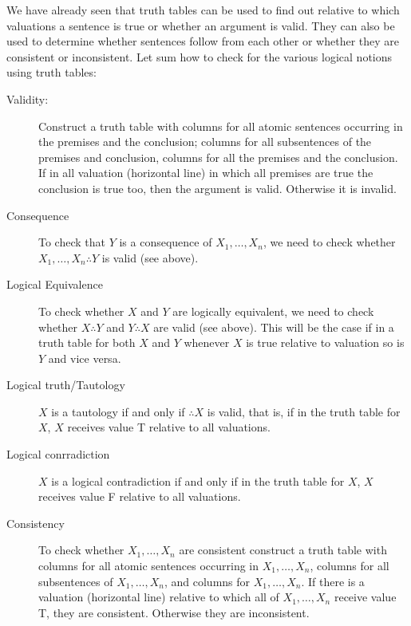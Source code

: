 We have already seen that truth tables can be used to find out relative to which valuations a sentence is true or whether an argument is valid. They can also be used to determine whether sentences follow from each other or whether they are consistent or inconsistent. Let sum how to check for the various logical notions using truth tables:

\begin{description}
\item[Validity:]Construct a truth table with columns for all atomic sentences occurring in the premises and the conclusion; columns for all subsentences of the premises and conclusion, columns for all the premises and the conclusion. If in all valuation (horizontal line) in which all premises are true the conclusion is true too, then the argument is valid. Otherwise it is invalid.
\item[Consequence]To check that $Y$ is a consequence of $X_1,\ldots,X_n$, we need to check whether $X_1,\ldots,X_n\therefore Y$ is valid (see above).
\item[Logical Equivalence] To check whether $X$ and $Y$ are logically equivalent, we need to check whether $X\therefore Y$ and $Y\therefore X$ are valid (see above). This will be the case if in a truth table for both $X$ and $Y$ whenever $X$ is true relative to valuation so is $Y$ and vice versa.
\item[Logical truth/Tautology] $X$ is a tautology if and only if $\therefore X$ is valid, that is, if in the truth table for $X$, $X$ receives value T relative to all valuations.
\item[Logical conrradiction]  $X$ is a logical contradiction if and only if in the truth table for $X$, $X$ receives value F relative to all valuations.
\item[Consistency]To check whether $X_1,\ldots,X_n$ are consistent construct a truth table with columns for all atomic sentences occurring in $X_1,\ldots,X_n$, columns for all subsentences of $X_1,\ldots,X_n$, and columns for $X_1,\ldots,X_n$. If there is a valuation (horizontal line) relative to which all of $X_1,\ldots,X_n$ receive value T, they are consistent. Otherwise they are inconsistent.
\end{description}

